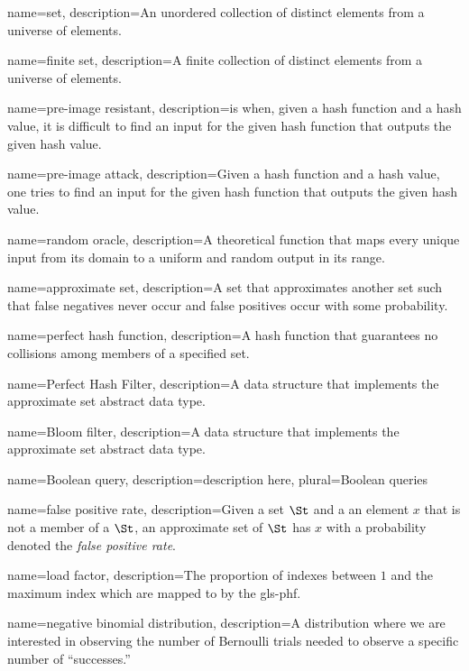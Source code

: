 {
    name={set},
    description={An unordered collection of distinct elements from a universe of elements.}
}

{
    name={finite set},
    description={A finite collection of distinct elements from a universe of elements.}
}

{
    name={pre-image resistant},
    description={is when, given a hash function and a hash value, it is difficult to find an input for the given hash function that outputs the given hash value.}
}

{
    name={pre-image attack},
    description={Given a hash function and a hash value, one tries to find an input for the given hash function that outputs the given hash value.}
}

{
    name={random oracle},
    description={A theoretical function that maps every unique input from its domain to a uniform and random output in its range.}
}

{
    name={approximate set},
    description={A set that approximates another set such that false negatives never occur and false positives occur with some probability.}
}

{
    name={perfect hash function},
    description={A hash function that guarantees no collisions among members of a specified set.}
}

{
    name={Perfect Hash Filter},
    description={A data structure that implements the approximate set abstract data type.}
}

{
    name={Bloom filter},
    description={A data structure that implements the approximate set abstract data type.}
}

{
    name={Boolean query},
    description={description here},
    plural={Boolean queries}
}

{
    name={false positive rate},
    description={Given a set $\St$ and a an element $x$ that is not a member of a $\St$, an approximate set of $\St$ has $x$ with a probability denoted the \emph{false positive rate}}.
}

{
    name={load factor},
    description={The proportion of indexes between $1$ and the maximum index which are mapped to by the \gls*{gls-phf}.}
}

{
    name={negative binomial distribution},
    description={A distribution where we are interested in observing the number of Bernoulli trials needed to observe a specific number of ``successes.''}
}

